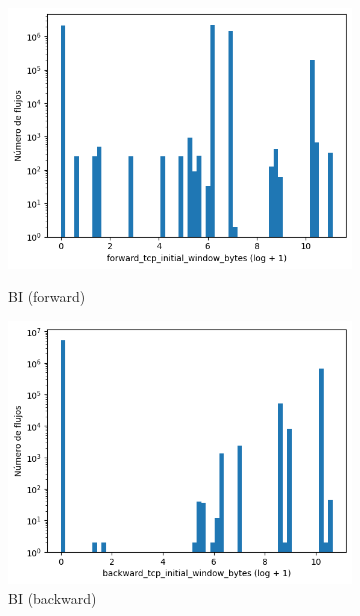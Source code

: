 \begin{figure}[H]
\begin{subfigure}[b]{0.26\textwidth}
        \includegraphics[width=\linewidth]{media/packet_pincer_botiot/forward_tcp_initial_window_bytes_log_x_log_y.png}
        \caption{BI (forward)}
        \includegraphics[width=\linewidth]{media/packet_pincer_botiot/backward_tcp_initial_window_bytes_log_x_log_y.png}
        \caption{BI (backward)}
    \end{subfigure}
    \hfill
    \begin{subfigure}[b]{0.26\textwidth}
        \centering

\end{subfigure}
\end{figure}
